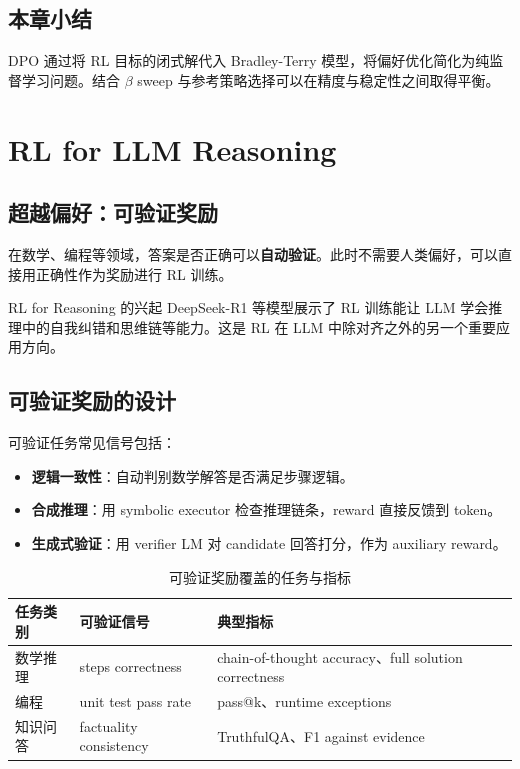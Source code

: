 \documentclass[a4paper]{article}
\begin{document}
\subsection{本章小结}

DPO 通过将 RL 目标的闭式解代入 Bradley-Terry 模型，将偏好优化简化为纯监督学习问题。结合 $\beta$ sweep 与参考策略选择可以在精度与稳定性之间取得平衡。

\section{RL for LLM Reasoning}

\subsection{超越偏好：可验证奖励}

在数学、编程等领域，答案是否正确可以\textbf{自动验证}。此时不需要人类偏好，可以直接用正确性作为奖励进行 RL 训练。

\begin{importantbox}{RL for Reasoning 的兴起}
DeepSeek-R1 等模型展示了 RL 训练能让 LLM 学会推理中的自我纠错和思维链等能力。这是 RL 在 LLM 中除对齐之外的另一个重要应用方向。
\end{importantbox}

\subsection{可验证奖励的设计}

可验证任务常见信号包括：
\begin{itemize}
    \item \textbf{逻辑一致性}：自动判别数学解答是否满足步骤逻辑。
    \item \textbf{合成推理}：用 symbolic executor 检查推理链条，reward 直接反馈到 token。
    \item \textbf{生成式验证}：用 verifier LM 对 candidate 回答打分，作为 auxiliary reward。
\end{itemize}

\begin{table}[H]
\centering
\begin{tabular}{p{} p{} p{}}
\toprule
任务类别 & 可验证信号 & 典型指标 \\
\midrule
数学推理 & steps correctness & chain-of-thought accuracy、full solution correctness \\
编程 & unit test pass rate & pass@k、runtime exceptions \\
知识问答 & factuality consistency & TruthfulQA、F1 against evidence \\
\bottomrule
\end{tabular}
\caption{可验证奖励覆盖的任务与指标}
\end{table}
\end{document}
